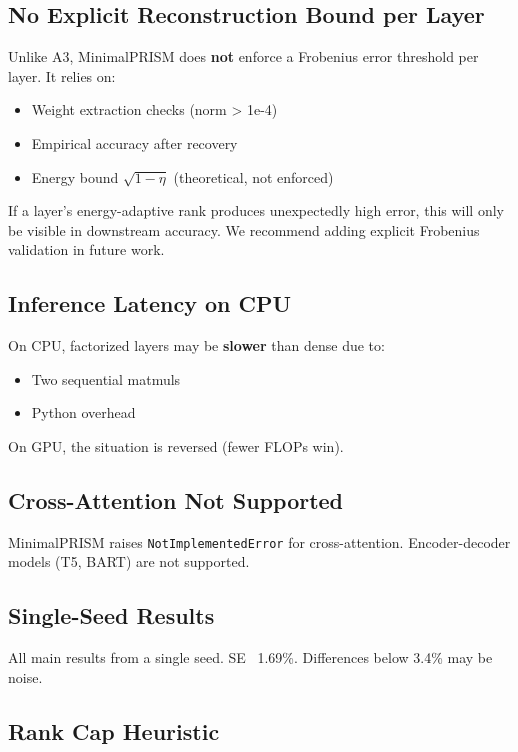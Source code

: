\subsection{No Explicit Reconstruction Bound per Layer}

Unlike A3, MinimalPRISM does \textbf{not} enforce a Frobenius error threshold 
per layer. It relies on:
\begin{itemize}
\item Weight extraction checks (norm \textgreater{} 1e-4)
\item Empirical accuracy after recovery
\item Energy bound $\sqrt{1 - \eta}$ (theoretical, not enforced)

\end{itemize}
If a layer's energy-adaptive rank produces unexpectedly high error, this 
will only be visible in downstream accuracy. We recommend adding explicit 
Frobenius validation in future work.

\subsection{Inference Latency on CPU}

On CPU, factorized layers may be \textbf{slower} than dense due to:
\begin{itemize}
\item Two sequential matmuls
\item Python overhead

\end{itemize}
On GPU, the situation is reversed (fewer FLOPs win).

\subsection{Cross-Attention Not Supported}

MinimalPRISM raises \texttt{NotImplementedError} for cross-attention. 
Encoder-decoder models (T5, BART) are not supported.

\subsection{Single-Seed Results}

All main results from a single seed. SE ~1.69\%. Differences below 3.4\% may 
be noise.

\subsection{Rank Cap Heuristic}

